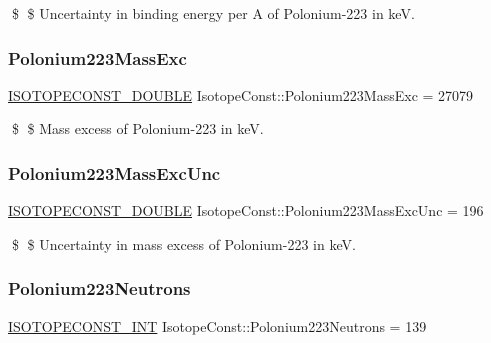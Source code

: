 \$ \$ Uncertainty in binding energy per A of Polonium-\/223 in keV. \mbox{\label{group___isotope_const-_polonium-_po223_ga9a5947cd29c30b5c4a861896fd5af923}} 
\subsubsection{\texorpdfstring{Polonium223\+Mass\+Exc}{Polonium223MassExc}}
{\footnotesize\ttfamily \mbox{\hyperlink{group___isotope_const-_macros_ga8f45a7272ce02c0b4c65c44636ed719a}{I\+S\+O\+T\+O\+P\+E\+C\+O\+N\+S\+T\+\_\+\+D\+O\+U\+B\+LE}} Isotope\+Const\+::\+Polonium223\+Mass\+Exc = 27079}

\$ \$ Mass excess of Polonium-\/223 in keV. \mbox{\label{group___isotope_const-_polonium-_po223_ga7899df31a8ef10cb07189a1fb41d9b52}} 
\subsubsection{\texorpdfstring{Polonium223\+Mass\+Exc\+Unc}{Polonium223MassExcUnc}}
{\footnotesize\ttfamily \mbox{\hyperlink{group___isotope_const-_macros_ga8f45a7272ce02c0b4c65c44636ed719a}{I\+S\+O\+T\+O\+P\+E\+C\+O\+N\+S\+T\+\_\+\+D\+O\+U\+B\+LE}} Isotope\+Const\+::\+Polonium223\+Mass\+Exc\+Unc = 196}

\$ \$ Uncertainty in mass excess of Polonium-\/223 in keV. \mbox{\label{group___isotope_const-_polonium-_po223_ga176fa8287791ac82fc8f0f53e70b808f}} 
\subsubsection{\texorpdfstring{Polonium223\+Neutrons}{Polonium223Neutrons}}
{\footnotesize\ttfamily \mbox{\hyperlink{group___isotope_const-_macros_ga5f18360b3e99483a35c32d789e62621c}{I\+S\+O\+T\+O\+P\+E\+C\+O\+N\+S\+T\+\_\+\+I\+NT}} Isotope\+Const\+::\+Polonium223\+Neutrons = 139}


